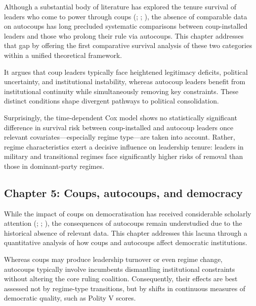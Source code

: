 \documentclass[
  12pt,
]{report}
\begin{document}
Although a substantial body of literature has explored the tenure
survival of leaders who come to power through coups
(;
;
), the absence of
comparable data on autocoups has long precluded systematic comparisons
between coup-installed leaders and those who prolong their rule via
autocoups. This chapter addresses that gap by offering the first
comparative survival analysis of these two categories within a unified
theoretical framework.

It argues that coup leaders typically face heightened legitimacy
deficits, political uncertainty, and institutional instability, whereas
autocoup leaders benefit from institutional continuity while
simultaneously removing key constraints. These distinct conditions shape
divergent pathways to political consolidation.

Surprisingly, the time-dependent Cox model shows no statistically
significant difference in survival risk between coup-installed and
autocoup leaders once relevant covariates---especially regime type---are
taken into account. Rather, regime characteristics exert a decisive
influence on leadership tenure: leaders in military and transitional
regimes face significantly higher risks of removal than those in
dominant-party regimes.

\subsection*{Chapter 5: Coups, autocoups, and
democracy}\label{chapter-5-coups-autocoups-and-democracy}

While the impact of coups on democratisation has received considerable
scholarly attention (; ;
), the consequences of
autocoups remain understudied due to the historical absence of relevant
data. This chapter addresses this lacuna through a quantitative analysis
of how coups and autocoups affect democratic institutions.

Whereas coups may produce leadership turnover or even regime change,
autocoups typically involve incumbents dismantling institutional
constraints without altering the core ruling coalition. Consequently,
their effects are best assessed not by regime-type transitions, but by
shifts in continuous measures of democratic quality, such as Polity V
scores.
\end{document}
